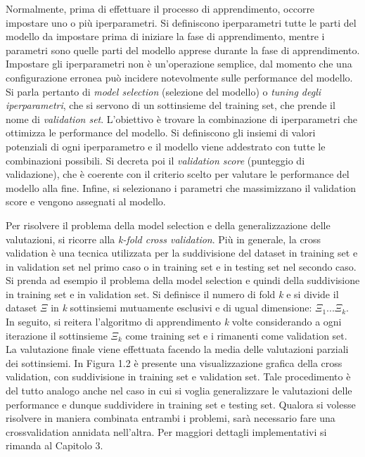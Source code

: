 \documentclass[11pt,  oneside, openany]{book}
\begin{document}
Normalmente, prima di effettuare il processo di apprendimento, occorre impostare uno o più iperparametri. Si definiscono iperparametri tutte le parti del modello da impostare prima di iniziare la fase di apprendimento, mentre i parametri sono quelle parti del modello apprese durante la fase di apprendimento. Impostare gli iperparametri non è un'operazione semplice, dal momento che una configurazione erronea può incidere notevolmente sulle performance del modello. Si parla pertanto di \textit{model selection} (selezione del modello) o \textit{tuning degli iperparametri}, che si servono di un sottinsieme del training set, che prende il nome di \textit{validation set}. L'obiettivo è trovare la combinazione di iperparametri che ottimizza le performance del modello. Si definiscono gli insiemi di valori potenziali di ogni iperparametro e il modello viene addestrato con tutte le combinazioni possibili. Si decreta poi il \textit{validation score} (punteggio di validazione), che è coerente con il criterio scelto per valutare le performance del modello alla fine. Infine, si selezionano i parametri che massimizzano il validation score e vengono assegnati al modello. 
 

Per risolvere il problema della model selection e della generalizzazione delle valutazioni, si ricorre alla \textit{k-fold cross validation}. Più in generale, la cross validation è una tecnica utilizzata per la suddivisione del dataset in training set e in validation set nel primo caso o in training set e in testing set nel secondo caso. Si prenda ad esempio il problema della model selection e quindi della suddivisione in training set e in validation set. Si definisce il numero di fold \textit{k} e si divide il dataset $\Xi$ in \textit{k} sottinsiemi mutuamente esclusivi e di ugual dimensione: $\Xi_1 ... \Xi_k$. In seguito, si reitera l'algoritmo di apprendimento \textit{k} volte considerando a ogni iterazione il sottinsieme $\Xi_k$ come training set e i rimanenti come validation set. La valutazione finale viene effettuata facendo la media delle valutazioni parziali dei sottinsiemi. In Figura 1.2 è presente una visualizzazione grafica della cross validation, con suddivisione in training set e validation set. Tale procedimento è del tutto analogo anche nel caso in cui si voglia generalizzare le valutazioni delle performance e dunque suddividere in training set e testing set. Qualora si volesse risolvere in maniera combinata entrambi i problemi, sarà necessario fare una crossvalidation annidata nell'altra. Per maggiori dettagli implementativi si rimanda al Capitolo 3. 
\end{document}
